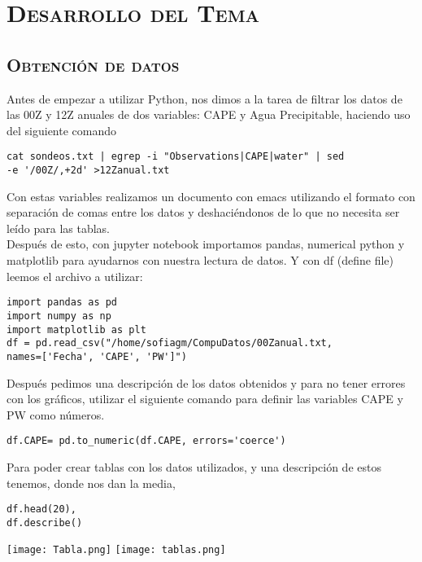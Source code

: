 \documentclass[12pt]{article}
\begin{document}
\pagebreak
\section{\textsc{Desarrollo del Tema}}
\subsection{\textsc{Obtención de datos}}
Antes de empezar a utilizar Python, nos dimos a la tarea de filtrar los datos de las 00Z y 12Z anuales de dos variables: CAPE y Agua Precipitable, haciendo uso del siguiente comando 

\begin{verbatim}
cat sondeos.txt | egrep -i "Observations|CAPE|water" | sed 
-e '/00Z/,+2d' >12Zanual.txt
\end{verbatim}

Con estas variables realizamos un documento con emacs utilizando el formato con separación de comas entre los datos y deshaciéndonos de lo que no necesita ser leído para las tablas. \\

Después de esto, con jupyter notebook importamos pandas, numerical python y matplotlib para ayudarnos con nuestra lectura de datos. Y con df (define file) leemos el archivo a utilizar:

\begin{verbatim}
import pandas as pd
import numpy as np
import matplotlib as plt
df = pd.read_csv("/home/sofiagm/CompuDatos/00Zanual.txt,
names=['Fecha', 'CAPE', 'PW']")
\end{verbatim}

Después pedimos una descripción de los datos obtenidos y para no tener errores con los gráficos, utilizar el siguiente comando para definir las variables CAPE y PW como números.

\begin{verbatim}
df.CAPE= pd.to_numeric(df.CAPE, errors='coerce')
\end{verbatim}

Para poder crear tablas con los datos utilizados, y una descripción de estos tenemos, donde nos dan la media, 

\begin{verbatim}
df.head(20),
df.describe()
\end{verbatim}


\texttt{[image: Tabla.png]}
\texttt{[image: tablas.png]}
\end{document}
